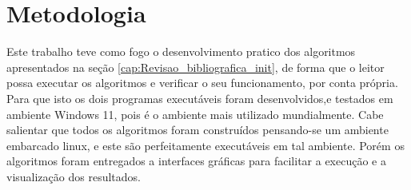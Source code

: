 \chapter{Metodologia}

Este trabalho teve como fogo o desenvolvimento pratico dos algoritmos apresentados na seção \ref{cap:Revisao_bibliografica_init},
de forma que o leitor possa executar os algoritmos e verificar o seu funcionamento, por conta própria.
Para que isto os dois programas executáveis foram desenvolvidos,e testados em ambiente Windows 11, pois é o ambiente mais utilizado mundialmente.
Cabe salientar que todos os algoritmos foram construídos pensando-se um ambiente embarcado linux, e este são perfeitamente executáveis em tal ambiente.
Porém os algoritmos foram entregados a interfaces gráficas para facilitar a execução e a visualização dos resultados.
